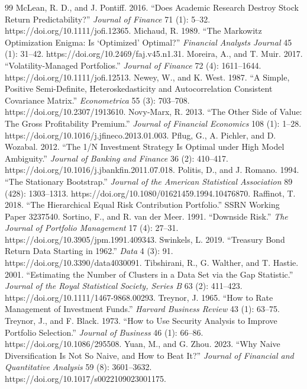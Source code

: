 \documentclass[12pt,letterpaper]{article}
\newcommand{\nuevo}[1]{{\color{nuevoc}#1}}
\begin{document}
\begin{thebibliography}{99}
 McLean, R. D., and J. Pontiff. 2016. ``Does Academic Research Destroy Stock Return Predictability?'' \emph{Journal of Finance} 71 (1): 5–32. https://doi.org/10.1111/jofi.12365.
 Michaud, R. 1989. ``The Markowitz Optimization Enigma: Is `Optimized' Optimal?'' \emph{Financial Analysts Journal} 45 (1): 31–42. https://doi.org/10.2469/faj.v45.n1.31.
 Moreira, A., and T. Muir. 2017. ``Volatility-Managed Portfolios.'' \emph{Journal of Finance} 72 (4): 1611–1644. https://doi.org/10.1111/jofi.12513.
 \nuevo{Newey, W., and K. West. 1987. ``A Simple, Positive Semi-Definite, Heteroskedasticity and Autocorrelation Consistent Covariance Matrix.'' \emph{Econometrica} 55 (3): 703–708. https://doi.org/10.2307/1913610.}
 \nuevo{Novy-Marx, R. 2013. ``The Other Side of Value: The Gross Profitability Premium.'' \emph{Journal of Financial Economics} 108 (1): 1–28. https://doi.org/10.1016/j.jfineco.2013.01.003.}
 Pflug, G., A. Pichler, and D. Wozabal. 2012. ``The 1/N Investment Strategy Is Optimal under High Model Ambiguity.'' \emph{Journal of Banking and Finance} 36 (2): 410–417. https://doi.org/10.1016/j.jbankfin.2011.07.018.
 Politis, D., and J. Romano. 1994. ``The Stationary Bootstrap.'' \emph{Journal of the American Statistical Association} 89 (428): 1303–1313. https://doi.org/10.1080/01621459.1994.10476870.
 Raffinot, T. 2018. ``The Hierarchical Equal Risk Contribution Portfolio.'' SSRN Working Paper 3237540.
 \nuevo{Sortino, F., and R. van der Meer. 1991. ``Downside Risk.'' \emph{The Journal of Portfolio Management} 17 (4): 27–31. https://doi.org/10.3905/jpm.1991.409343.}
 Swinkels, L. 2019. ``Treasury Bond Return Data Starting in 1962.'' \emph{Data} 4 (3): 91. https://doi.org/10.3390/data4030091.
 Tibshirani, R., G. Walther, and T. Hastie. 2001. ``Estimating the Number of Clusters in a Data Set via the Gap Statistic.'' \emph{Journal of the Royal Statistical Society, Series B} 63 (2): 411–423. https://doi.org/10.1111/1467-9868.00293.
 \nuevo{Treynor, J. 1965. ``How to Rate Management of Investment Funds.'' \emph{Harvard Business Review} 43 (1): 63–75.}
 \nuevo{Treynor, J., and F. Black. 1973. ``How to Use Security Analysis to Improve Portfolio Selection.'' \emph{Journal of Business} 46 (1): 66–86. https://doi.org/10.1086/295508.}
 Yuan, M., and G. Zhou. 2023. ``Why Naive Diversification Is Not So Naive, and How to Beat It?'' \emph{Journal of Financial and Quantitative Analysis} 59 (8): 3601–3632. https://doi.org/10.1017/s0022109023001175.
\end{thebibliography}
\end{document}
